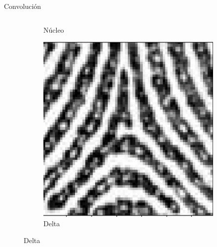 \documentclass[12pt,aspectratio=169]{beamer}
\begin{document}
\begin{frame}{Convolución}
\begin{columns}[c]
\begin{itemize}
\begin{figure}
\begin{subfigure}{0.21\textwidth}
                        \caption{Núcleo}
                    \end{subfigure}
                    \begin{subfigure}{0.21\textwidth}
                        \centering
                        \includegraphics[scale=0.1]{figs/fhl_1.png}
                        \caption{Delta}
                    \end{subfigure}
                \end{figure}
                \vspace{3mm}
                
            \end{itemize}
    \end{columns}

\end{frame}
\end{document}
